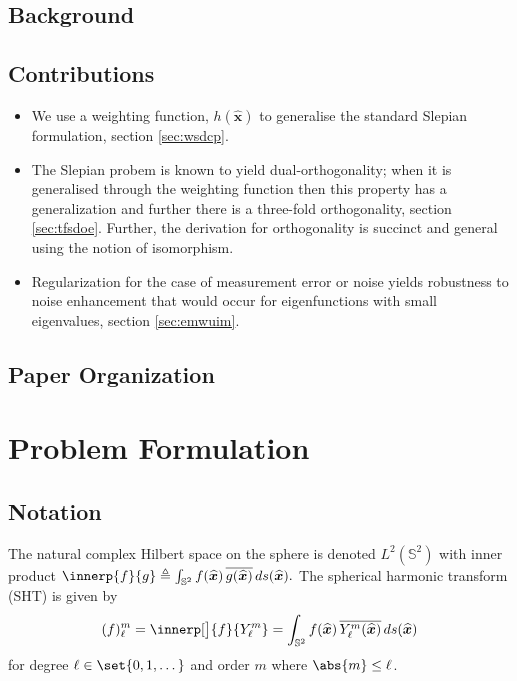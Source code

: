 \documentclass[10pt, twocolumn, twoside]{IEEEtran}
\newcommand{\untsph}{\mathbb{S}^{2}} %
\newcommand{\unit}[1]{\widehat{\bm{#1}}}
\newcommand{\dfn}{\triangleq}
\newcommand{\conj}[1]{\overline{#1}} %
\begin{document}
\subsection{Background}

\lipsum[4]

\subsection{Contributions}

\begin{itemize}
\item
We use a weighting function, $h(\unit{x})$ to generalise the standard Slepian formulation, section \ref{sec:wsdcp}.
\item
The Slepian probem is known to yield dual-orthogonality; when it is generalised through the weighting function then this property has a generalization and further there is a three-fold orthogonality, section \ref{sec:tfsdoe}.  Further, the derivation for orthogonality is succinct and general using the notion of isomorphism.
\item
Regularization for the case of measurement error or noise yields robustness to noise enhancement that would occur for eigenfunctions with small eigenvalues, section \ref{sec:emwuim}.
\end{itemize}

\subsection{Paper Organization}

\lipsum[13]

\section{Problem Formulation}

\subsection{Notation}

The natural complex Hilbert space on the sphere is denoted $L^2(\untsph)$ with inner product
\(
	\innerp{f}{g}\dfn\int_{\untsph} f(\unit{x})\,
		\conj{g(\unit{x})}\,ds(\unit{x}).
\)
The spherical harmonic transform (SHT) is given by
\[
	(f)_{\ell}^{m}=\innerp[\big]{f}{Y_{\ell}^{m}}
	=\int_{\untsph} f(\unit{x})\,\conj{Y_{\ell}^{m}(\unit{x})}\,ds(\unit{x})
\]
for degree $\ell\in\set{0,1,\dots}$ and order $m$ where $\abs{m}\leq \ell$.
\end{document}
